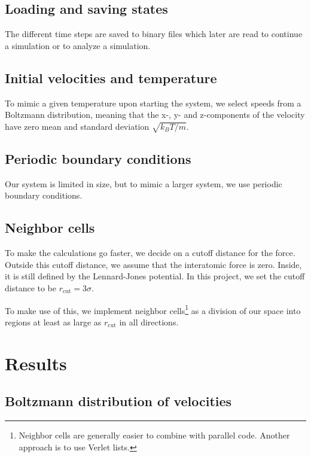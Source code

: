 \documentclass[reprint,floatfix,amsmath,amssymb,aps,pra]{revtex4-1}
\begin{document}
\subsection{Loading and saving states}

The different time steps are saved to binary files which later are read to continue a simulation or to analyze a simulation.

\subsection{Initial velocities and temperature}

To mimic a given temperature upon starting the system, we select speeds from a Boltzmann distribution, meaning that the x-, y- and z-components of the velocity have zero mean and standard deviation $\sqrt{k_{B}T / m}$.

\subsection{Periodic boundary conditions}

Our system is limited in size, but to mimic a larger system, we use periodic boundary conditions. 

\subsection{Neighbor cells}

To make the calculations go faster, we decide on a cutoff distance for the force. Outside this cutoff distance, we assume that the interatomic force is zero. Inside, it is still defined by the Lennard-Jones potential. In this project, we set the cutoff distance to be $r_{\text{cut}} = 3 \sigma$.

To make use of this, we implement neighbor cells\footnote{Neighbor cells are generally easier to combine with parallel code. Another approach is to use Verlet lists.} as a division of our space into regions at least as large as $r_{\text{cut}}$ in all directions.

\section{Results}

\subsection{Boltzmann distribution of velocities}
\end{document}
